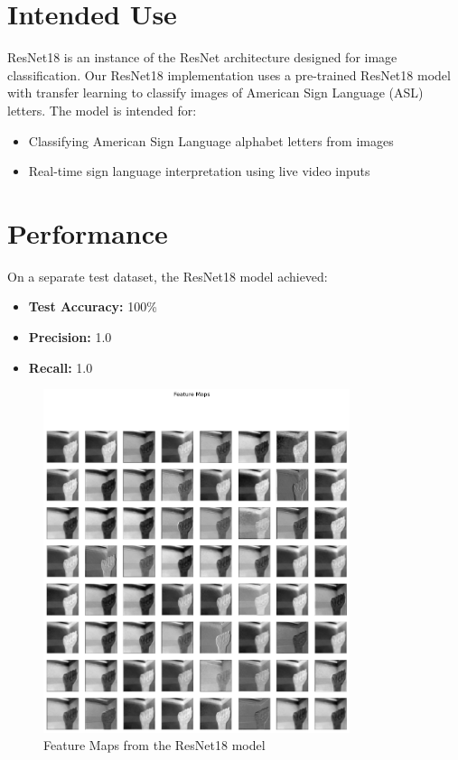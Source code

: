 \documentclass[12pt, a4paper]{article}
\begin{document}
\section{Intended Use}
ResNet18 is an instance of the ResNet architecture designed for image classification. Our ResNet18 implementation uses a pre-trained ResNet18 model with transfer learning to classify images of American Sign Language (ASL) letters. The model is intended for:
\begin{itemize}
    \item Classifying American Sign Language alphabet letters from images
    \item Real-time sign language interpretation using live video inputs
\end{itemize}

\section{Performance}
On a separate test dataset, the ResNet18 model achieved:
\begin{itemize}
    \item \textbf{Test Accuracy:} 100\%
    \item \textbf{Precision:} 1.0
    \item \textbf{Recall:} 1.0
\end{itemize}
\begin{figure}[H]
    \centering
    \includegraphics[width=0.8\textwidth]{../../plots/ResNet18_Visualize.png}
    \caption{Feature Maps from the ResNet18 model}
    \label{fig:resnet18_visualize}
\end{figure}
\end{document}
